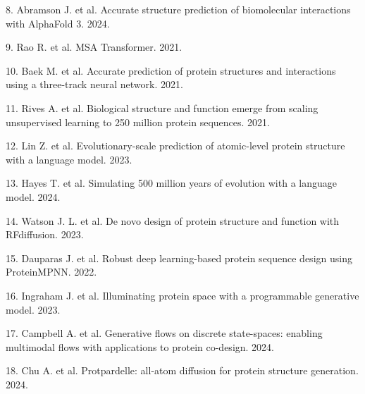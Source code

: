\documentclass[10pt]{article}
\begin{document}
8. Abramson J. et al. Accurate structure prediction of biomolecular interactions with AlphaFold 3. 2024.\par

9. Rao R. et al. MSA Transformer. 2021.\par

10. Baek M. et al. Accurate prediction of protein structures and interactions using a three-track neural network. 2021.\par

11. Rives A. et al. Biological structure and function emerge from scaling unsupervised learning to 250 million protein sequences. 2021.\par

12. Lin Z. et al. Evolutionary-scale prediction of atomic-level protein structure with a language model. 2023.\par

13. Hayes T. et al. Simulating 500 million years of evolution with a language model. 2024.\par

14. Watson J. L. et al. De novo design of protein structure and function with RFdiffusion. 2023.\par

15. Dauparas J. et al. Robust deep learning-based protein sequence design using ProteinMPNN. 2022.\par

16. Ingraham J. et al. Illuminating protein space with a programmable generative model. 2023.\par

17. Campbell A. et al. Generative flows on discrete state-spaces: enabling multimodal flows with applications to protein co-design. 2024.\par

18. Chu A. et al. Protpardelle: all-atom diffusion for protein structure generation. 2024.\par
\end{document}

